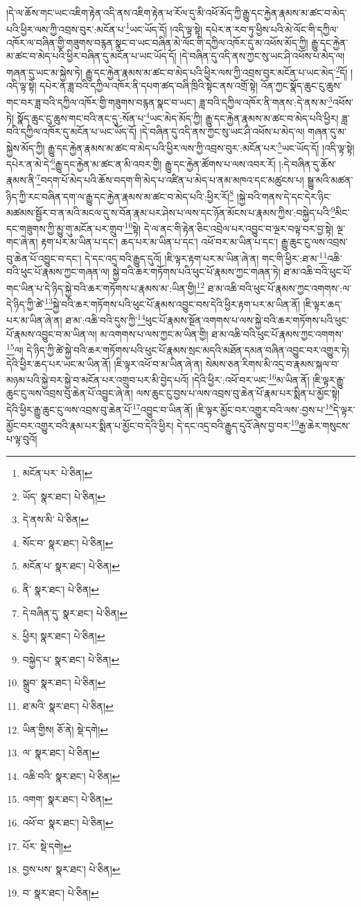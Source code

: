།དེ་ལ་ཆོས་གང་ཡང་འཇིག་རྟེན་འདི་ནས་འཇིག་རྟེན་ཕ་རོལ་དུ་མི་འཕོ་མོད་ཀྱི་རྒྱུ་དང་རྐྱེན་རྣམས་མ་ཚང་བ་མེད་པའི་ཕྱིར་ལས་ཀྱི་འབྲས་བུར་:མངོན་པ་\footnote{མངོན་པར་  པེ་ཅིན། }ཡང་ཡོད་དོ། །འདི་ལྟ་སྟེ། དཔེར་ན་རབ་ཏུ་ཕྱིས་པའི་མེ་ལོང་གི་དཀྱིལ་འཁོར་ལ་བཞིན་གྱི་གཟུགས་བརྙན་སྣང་བ་ཡང་བཞིན་མེ་ལོང་གི་དཀྱིལ་འཁོར་དུ་མ་འཕོས་མོད་ཀྱི། རྒྱུ་དང་རྐྱེན་མ་ཚང་བ་མེད་པའི་ཕྱིར་བཞིན་དུ་མངོན་པ་ཡང་ཡོད་དོ། །དེ་བཞིན་དུ་འདི་ནས་ཀྱང་སུ་ཡང་ཤི་འཕོས་པ་མེད་ལ། གཞན་དུ་ཡང་མ་སྐྱེས་ཏེ། རྒྱུ་དང་རྐྱེན་རྣམས་མ་ཚང་བ་མེད་པའི་ཕྱིར་ལས་ཀྱི་འབྲས་བུར་མངོན་པ་ཡང་མེད་\footnote{ཡོད་  སྣར་ཐང་།  པེ་ཅིན། }དོ། །འདི་ལྟ་སྟེ། དཔེར་ན་ཟླ་བའི་དཀྱིལ་འཁོར་ནི་དཔག་ཚད་བཞི་ཁྲིའི་སྟེང་ནས་འགྲོ་སྟེ། འོན་ཀྱང་སྣོད་ཆུང་ངུ་ཆུས་གང་བར་ཟླ་བའི་དཀྱིལ་འཁོར་གྱི་གཟུགས་བརྙན་སྣང་བ་ཡང་། ཟླ་བའི་དཀྱིལ་འཁོར་ནི་གནས་:དེ་ནས་མ་\footnote{དེ་ནས་མི་  པེ་ཅིན། }འཕོས་ཏེ། སྣོད་ཆུང་ངུ་ཆུས་གང་བའི་ནང་དུ་:སོན་པ་\footnote{སོང་བ་  སྣར་ཐང་།  པེ་ཅིན། }ཡང་མེད་མོད་ཀྱི། རྒྱུ་དང་རྐྱེན་རྣམས་མ་ཚང་བ་མེད་པའི་ཕྱིར། ཟླ་བའི་དཀྱིལ་འཁོར་དུ་མངོན་པ་ཡང་ཡོད་དོ། །དེ་བཞིན་དུ་འདི་ནས་ཀྱང་སུ་ཡང་ཤི་འཕོས་པ་མེད་ལ། གཞན་དུ་མ་སྐྱེས་མོད་ཀྱི། རྒྱུ་དང་རྐྱེན་རྣམས་མ་ཚང་བ་མེད་པའི་ཕྱིར་ལས་ཀྱི་འབྲས་བུར་:མངོན་པར་\footnote{མངོན་པ་  སྣར་ཐང་།  པེ་ཅིན། }ཡང་ཡོད་དོ། །འདི་ལྟ་སྟེ། དཔེར་ན་མེ་དེ་\footnote{ནི་  སྣར་ཐང་།  པེ་ཅིན། }རྒྱུ་དང་རྐྱེན་མ་ཚང་ན་མི་འབར་གྱི། རྒྱུ་དང་རྐྱེན་ཚོགས་པ་ལས་འབར་རོ། །:དེ་བཞིན་དུ་ཆོས་རྣམས་ནི་\footnote{དེ་བཞིན་དུ་  སྣར་ཐང་།  པེ་ཅིན། }བདག་པོ་མེད་པའི་ཆོས་བདག་གི་མེད་པ་འཛིན་པ་མེད་པ་ནམ་མཁའ་དང་མཚུངས་པ། སྒྱུ་མའི་མཚན་ཉིད་ཀྱི་རང་བཞིན་དག་ལ་རྒྱུ་དང་རྐྱེན་རྣམས་མ་ཚང་བ་མེད་པའི་:ཕྱིར་རོ།\footnote{ཕྱིར།  སྣར་ཐང་།  པེ་ཅིན། } །སྐྱེ་བའི་གནས་དེ་དང་དེར་ཉིང་མཚམས་སྦྱོར་བ་ན་མའི་མངལ་དུ་ས་བོན་རྣམ་པར་ཤེས་པ་ལས་དང་ཉོན་མོངས་པ་རྣམས་ཀྱིས་:བསྐྱེད་པའི་\footnote{བསྐྱེད་པ་  སྣར་ཐང་།  པེ་ཅིན། }མིང་དང་གཟུགས་ཀྱི་མྱུ་གུ་མངོན་པར་གྲུབ་\footnote{སྒྲུབ་  སྣར་ཐང་།  པེ་ཅིན། }སྟེ། དེ་ལ་ནང་གི་རྟེན་ཅིང་འབྲེལ་པར་འབྱུང་བ་ལྔར་བལྟ་བར་བྱ་སྟེ། ལྔ་གང་ཞེ་ན། རྟག་པར་མ་ཡིན་པ་དང་། ཆད་པར་མ་ཡིན་པ་དང་། འཕོ་བར་མ་ཡིན་པ་དང་། རྒྱུ་ཆུང་ངུ་ལས་འབྲས་བུ་ཆེན་པོ་འབྱུང་བ་དང་། དེ་དང་འདྲ་བའི་རྒྱུད་དུའོ། །ཇི་ལྟར་རྟག་པར་མ་ཡིན་ཞེ་ན། གང་གི་ཕྱིར་:ཐ་མ་\footnote{ཐ་མའི་  སྣར་ཐང་།  པེ་ཅིན། }འཆི་བའི་ཕུང་པོ་རྣམས་ཀྱང་གཞན་ལ། སྐྱེ་བའི་ཆར་གཏོགས་པའི་ཕུང་པོ་རྣམས་ཀྱང་གཞན་ཏེ། ཐ་མ་འཆི་བའི་ཕུང་པོ་གང་ཡིན་པ་དེ་ཉིད་སྐྱེ་བའི་ཆར་གཏོགས་པ་རྣམས་མ་:ཡིན་གྱི།\footnote{ཡིན་གྱིས།  ཅོ་ནེ།  སྡེ་དགེ། } ཐ་མ་འཆི་བའི་ཕུང་པོ་རྣམས་ཀྱང་འགགས་:ལ་དེ་ཉིད་ཀྱི་ཚེ་\footnote{ལ་  སྣར་ཐང་།  པེ་ཅིན། }སྐྱེ་བའི་ཆར་གཏོགས་པའི་ཕུང་པོ་རྣམས་འབྱུང་བས་དེའི་ཕྱིར་རྟག་པར་མ་ཡིན་ནོ། །ཇི་ལྟར་ཆད་པར་མ་ཡིན་ཞེ་ན། ཐ་མ་:འཆི་བའི་དུས་ཀྱི་\footnote{འཆི་བའི་  སྣར་ཐང་།  པེ་ཅིན། }ཕུང་པོ་རྣམས་སྔོན་འགགས་པ་ལས་སྐྱེ་བའི་ཆར་གཏོགས་པའི་ཕུང་པོ་རྣམས་འབྱུང་བ་མ་ཡིན་ལ། མ་འགགས་པ་ལས་ཀྱང་མ་ཡིན་གྱི། ཐ་མ་འཆི་བའི་ཕུང་པོ་རྣམས་ཀྱང་འགགས་\footnote{འགག་  སྣར་ཐང་།  པེ་ཅིན། }ལ། དེ་ཉིད་ཀྱི་ཚེ་སྐྱེ་བའི་ཆར་གཏོགས་པའི་ཕུང་པོ་རྣམས་སྲང་མདའི་མཐོན་དམན་བཞིན་འབྱུང་བར་འགྱུར་ཏེ། དེའི་ཕྱིར་ཆད་པར་ཡང་མ་ཡིན་ནོ། །ཇི་ལྟར་འཕོ་བ་མ་ཡིན་ཞེ་ན། སེམས་ཅན་རིགས་མི་འདྲ་བ་རྣམས་སྐལ་བ་མཉམ་པའི་སྐྱེ་བར་སྐྱེ་བ་མངོན་པར་འགྲུབ་པར་མི་བྱེད་པའོ། །དེའི་ཕྱིར་:འཕོ་བར་ཡང་\footnote{འཕོ་བ་  སྣར་ཐང་།  པེ་ཅིན། }མ་ཡིན་ནོ། །ཇི་ལྟར་རྒྱུ་ཆུང་ངུ་ལས་འབྲས་བུ་ཆེན་པོ་འབྱུང་ཞེ་ན། ལས་ཆུང་ངུ་བྱས་པ་ལས་འབྲས་བུ་ཆེན་པོ་རྣམ་པར་སྨིན་པ་མྱོང་སྟེ། དེའི་ཕྱིར་རྒྱུ་ཆུང་ངུ་ལས་འབྲས་བུ་ཆེན་པོ་\footnote{པོར་  སྡེ་དགེ། }འབྱུང་བ་ཡིན་ནོ། །ཇི་ལྟར་མྱོང་བར་འགྱུར་བའི་ལས་:བྱས་པ་\footnote{བྱས་པས་  སྣར་ཐང་།  པེ་ཅིན། }དེ་ལྟར་མྱོང་བར་འགྱུར་བའི་རྣམ་པར་སྨིན་པ་མྱོང་བ་དེའི་ཕྱིར། དེ་དང་འདྲ་བའི་རྒྱུད་དུའོ་ཞེས་བྱ་བར་\footnote{བ་  སྣར་ཐང་།  པེ་ཅིན། }རྒྱ་ཆེར་གསུངས་པ་ལྟ་བུའོ། 